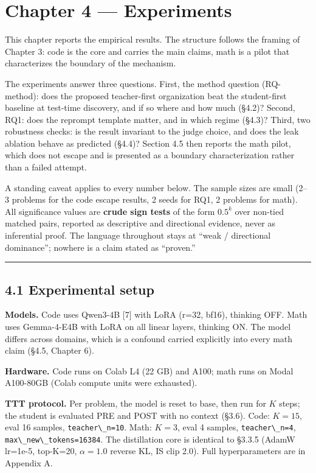 \chapter{Chapter 4 --- Experiments}\label{chapter-4-experiments}

This chapter reports the empirical results. The structure follows the framing of Chapter 3: code is the core and carries the main claims, math is a pilot that characterizes the boundary of the mechanism.

The experiments answer three questions. First, the method question (RQ-method): does the proposed teacher-first organization beat the student-first baseline at test-time discovery, and if so where and how much (§4.2)? Second, RQ1: does the reprompt template matter, and in which regime (§4.3)? Third, two robustness checks: is the result invariant to the judge choice, and does the leak ablation behave as predicted (§4.4)? Section 4.5 then reports the math pilot, which does not escape and is presented as a boundary characterization rather than a failed attempt.

A standing caveat applies to every number below. The sample sizes are small (2--3 problems for the code escape results, 2 seeds for RQ1, 2 problems for math). All significance values are \textbf{crude sign tests} of the form \(0.5^k\) over non-tied matched pairs, reported as descriptive and directional evidence, never as inferential proof. The language throughout stays at ``weak / directional dominance''; nowhere is a claim stated as ``proven.''

\begin{center}\rule{0.5\linewidth}{0.5pt}\end{center}

\section{4.1 Experimental setup}\label{experimental-setup}

\textbf{Models.} Code uses Qwen3-4B {[}7{]} with LoRA (r=32, bf16), thinking OFF. Math uses Gemma-4-E4B with LoRA on all linear layers, thinking ON. The model differs across domains, which is a confound carried explicitly into every math claim (§4.5, Chapter 6).

\textbf{Hardware.} Code runs on Colab L4 (22 GB) and A100; math runs on Modal A100-80GB (Colab compute units were exhausted).

\textbf{TTT protocol.} Per problem, the model is reset to base, then run for \(K\) steps; the student is evaluated PRE and POST with no context (§3.6). Code: \(K=15\), eval 16 samples, \passthrough{\lstinline!teacher\_n=10!}. Math: \(K=3\), eval 4 samples, \passthrough{\lstinline!teacher\_n=4!}, \passthrough{\lstinline!max\_new\_tokens=16384!}. The distillation core is identical to §3.3.5 (AdamW lr=1e-5, top-K=20, \(\alpha=1.0\) reverse KL, IS clip 2.0). Full hyperparameters are in Appendix A.

